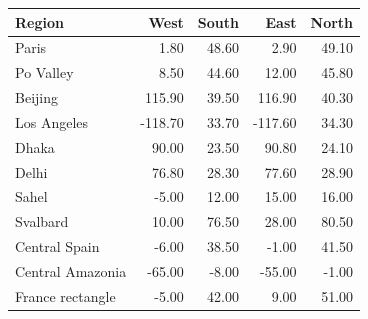 \begin{center}\small
\begin{tabular}{@{}lrrrr@{}}
\toprule
Region & West & South & East & North \\
\midrule
Paris & 1.80 & 48.60 & 2.90 & 49.10 \\
Po Valley & 8.50 & 44.60 & 12.00 & 45.80 \\
Beijing & 115.90 & 39.50 & 116.90 & 40.30 \\
Los Angeles & -118.70 & 33.70 & -117.60 & 34.30 \\
Dhaka & 90.00 & 23.50 & 90.80 & 24.10 \\
Delhi & 76.80 & 28.30 & 77.60 & 28.90 \\
Sahel & -5.00 & 12.00 & 15.00 & 16.00 \\
Svalbard & 10.00 & 76.50 & 28.00 & 80.50 \\
Central Spain & -6.00 & 38.50 & -1.00 & 41.50 \\
Central Amazonia & -65.00 & -8.00 & -55.00 & -1.00 \\
France rectangle & -5.00 & 42.00 & 9.00 & 51.00 \\
\bottomrule
\end{tabular}
\end{center}